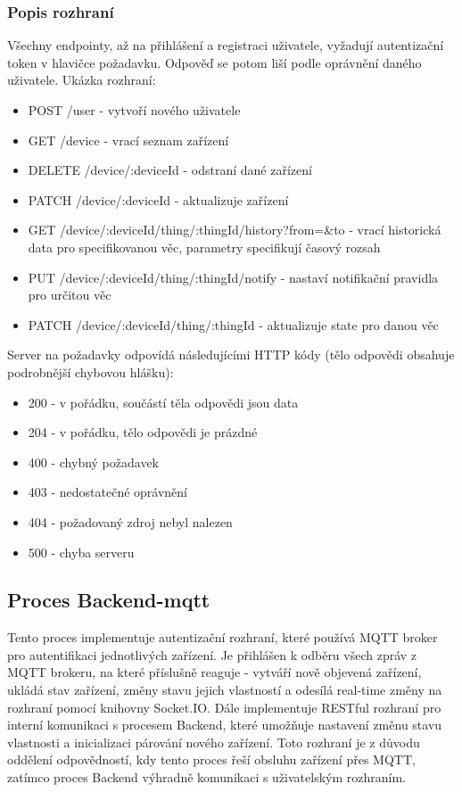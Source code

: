 \subsubsection{Popis rozhraní}
Všechny endpointy, až na přihlášení a registraci uživatele, vyžadují autentizační token v hlavičce požadavku. Odpověď se potom liší podle oprávnění daného uživatele. Ukázka rozhraní:
\begin{itemize}
    \item POST /user - vytvoří nového uživatele
    \item GET /device - vrací seznam zařízení
    \item DELETE /device/:deviceId - odstraní dané zařízení
    \item PATCH /device/:deviceId - aktualizuje zařízení
    \item GET /device/:deviceId/thing/:thingId/history?from=\&to - vrací historická data pro specifikovanou věc, parametry specifikují časový rozsah
    \item PUT /device/:deviceId/thing/:thingId/notify - nastaví notifikační pravidla pro určitou věc
    \item PATCH /device/:deviceId/thing/:thingId - aktualizuje state pro danou věc
\end{itemize}

Server na požadavky odpovídá následujícími HTTP kódy (tělo odpovědi obsahuje podrobnější chybovou hlášku):
\begin{itemize}
    \item 200 - v pořádku, součástí těla odpovědi jsou data
    \item 204 - v pořádku, tělo odpovědi je prázdné
    \item 400 - chybný požadavek
    \item 403 - nedostatečné oprávnění
    \item 404 - požadovaný zdroj nebyl nalezen
    \item 500 - chyba serveru
\end{itemize}


\subsection{Proces Backend-mqtt}
Tento proces implementuje autentizační rozhraní, které používá MQTT broker pro autentifikaci jednotlivých zařízení. Je přihlášen k odběru všech zpráv z MQTT brokeru, na které příslušně reaguje - vytváří nově objevená zařízení, ukládá stav zařízení, změny stavu jejich vlastností a odesílá real-time změny na rozhraní pomocí knihovny Socket.IO. Dále implementuje RESTful rozhraní pro interní komunikaci s procesem Backend, které umožňuje nastavení změnu stavu vlastnosti a inicializaci párování nového zařízení. Toto rozhraní je z důvodu oddělení odpovědností, kdy tento proces řeší obsluhu zařízení přes MQTT, zatímco proces Backend výhradně komunikaci s uživatelským rozhraním.


